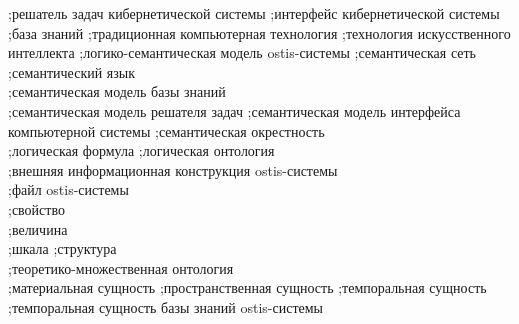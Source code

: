 {		
;решатель задач кибернетической системы
;интерфейс кибернетической системы
;база знаний
;традиционная компьютерная технология
;технология искусственного интеллекта
;логико-семантическая модель ostis-системы
;семантическая сеть
;семантический язык\\
;семантическая модель базы знаний\\
;семантическая модель решателя задач
;семантическая модель интерфейса компьютерной системы
;семантическая окрестность\\
;логическая формула
;логическая онтология\\
;внешняя информационная конструкция ostis-системы\\
;файл ostis-системы\\
;свойство\\
;величина\\
;шкала
;структура\\
;теоретико-множественная онтология\\
;материальная сущность
;пространственная сущность
;темпоральная сущность\\
;темпоральная сущность базы знаний ostis-системы\\
}
